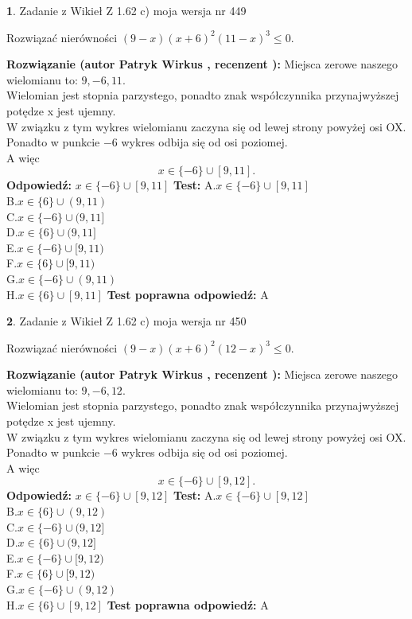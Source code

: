 \documentclass[12pt, a4paper]{article}
\theoremstyle{definition} %
\newtheorem{zad}{}
\newcommand{\zadStart}[1]{\begin{zad}#1\newline}
\newcommand{\zadStop}{\end{zad}}
\newcommand{\rozwStart}[2]{\noindent \textbf{Rozwiązanie (autor #1 , recenzent #2): }\newline}
\newcommand{\rozwStop}{\newline}
\newcommand{\odpStart}{\noindent \textbf{Odpowiedź:}\newline}
\newcommand{\odpStop}{\newline}
\newcommand{\testStart}{\noindent \textbf{Test:}\newline}
\newcommand{\testStop}{\newline}
\newcommand{\kluczStart}{\noindent \textbf{Test poprawna odpowiedź:}\newline}
\newcommand{\kluczStop}{\newline}
\begin{document}
\zadStart{Zadanie z Wikieł Z 1.62 c) moja wersja nr 449}

Rozwiązać nierówności $(9-x)(x+6)^{2}(11-x)^{3}\le0$.
\zadStop
\rozwStart{Patryk Wirkus}{}
Miejsca zerowe naszego wielomianu to: $9, -6, 11$.\\
Wielomian jest stopnia parzystego, ponadto znak współczynnika przy\linebreak najwyższej potędze x jest ujemny.\\ W związku z tym wykres wielomianu zaczyna się od lewej strony powyżej osi OX.\\
Ponadto w punkcie $-6$ wykres odbija się od osi poziomej.\\
A więc $$x \in \{-6\} \cup [9,11].$$
\rozwStop
\odpStart
$x \in \{-6\} \cup [9,11]$
\odpStop
\testStart
A.$x \in \{-6\} \cup [9,11]$\\
B.$x \in \{6\} \cup (9,11)$\\
C.$x \in \{-6\} \cup (9,11]$\\
D.$x \in \{6\} \cup (9,11]$\\
E.$x \in \{-6\} \cup [9,11)$\\
F.$x \in \{6\} \cup [9,11)$\\
G.$x \in \{-6\} \cup (9,11)$\\
H.$x \in \{6\} \cup [9,11]$
\testStop
\kluczStart
A
\kluczStop



\zadStart{Zadanie z Wikieł Z 1.62 c) moja wersja nr 450}

Rozwiązać nierówności $(9-x)(x+6)^{2}(12-x)^{3}\le0$.
\zadStop
\rozwStart{Patryk Wirkus}{}
Miejsca zerowe naszego wielomianu to: $9, -6, 12$.\\
Wielomian jest stopnia parzystego, ponadto znak współczynnika przy\linebreak najwyższej potędze x jest ujemny.\\ W związku z tym wykres wielomianu zaczyna się od lewej strony powyżej osi OX.\\
Ponadto w punkcie $-6$ wykres odbija się od osi poziomej.\\
A więc $$x \in \{-6\} \cup [9,12].$$
\rozwStop
\odpStart
$x \in \{-6\} \cup [9,12]$
\odpStop
\testStart
A.$x \in \{-6\} \cup [9,12]$\\
B.$x \in \{6\} \cup (9,12)$\\
C.$x \in \{-6\} \cup (9,12]$\\
D.$x \in \{6\} \cup (9,12]$\\
E.$x \in \{-6\} \cup [9,12)$\\
F.$x \in \{6\} \cup [9,12)$\\
G.$x \in \{-6\} \cup (9,12)$\\
H.$x \in \{6\} \cup [9,12]$
\testStop
\kluczStart
A
\kluczStop
\end{document}
